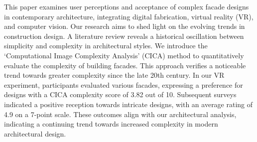 
This paper examines user perceptions and acceptance of complex facade designs in contemporary architecture, integrating digital fabrication, virtual reality (VR), and computer vision.
Our research aims to shed light on the evolving trends in construction design.
A literature review reveals a historical oscillation between simplicity and complexity in architectural styles.
We introduce the `Computational Image Complexity Analysis' (CICA) method to quantitatively evaluate the complexity of building facades.
This approach verifies a noticeable trend towards greater complexity since the late 20th century.
In our VR experiment, participants evaluated various facades, expressing a preference for designs with a CICA complexity score of 3.82 out of 10.
Subsequent surveys indicated a positive reception towards intricate designs, with an average rating of 4.9 on a 7-point scale.
These outcomes align with our architectural analysis, indicating a continuing trend towards increased complexity in modern architectural design.

